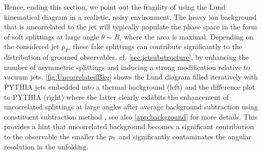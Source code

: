Hence, ending this section, we point out the fragility of using the Lund kinematical diagram in a realistic, noisy environment.
The heavy ion background that is uncorrelated to the jet will typically populate the phase space in the form of soft splittings at large angle $\theta \sim R$, where the area is maximal. Depending on the considered jet $p_{T}$, these fake splittings can contribute significantly to the distribution of groomed observables, cf. \autoref{sec:jetsubstructure}, by enhancing the number of asymmetric splittings and inducing a strong modification relative to vacuum jets. 
\autoref{fig:UncorrelatedBkg} shows the Lund diagram filled iteratively with PYTHIA jets embedded into a thermal background (left) and the difference plot to PYTHIA (right) where the latter clearly exhibits the enhancement of uncorrelated splittings at large angles after average background subtraction using constituent subtraction method \cite{Berta:2014eza}, see also \autoref{app:background} for more details. 
This provides a hint that uncorrelated background becomes a significant contribution to the observable the smaller the $p_{\text{\tiny T}}$ and significantly contaminates the angular resolution in the unfolding.


